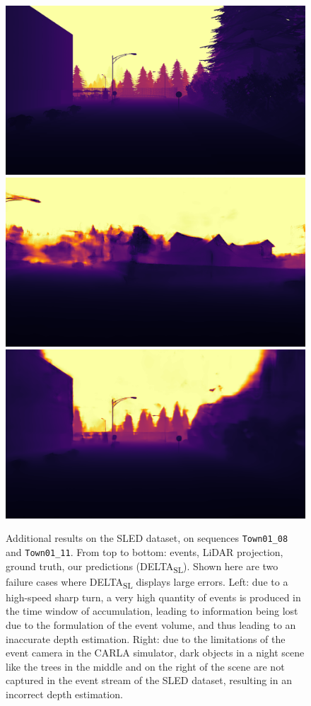 \begin{figure}
  \includegraphics[width=0.475\linewidth]{mainmatter/figures/c_depth_transf/sled_dense_cmp_additional/data_and_gt/gtprev002216.png}\\
  \includegraphics[width=0.475\linewidth]{mainmatter/figures/c_depth_transf/sled_dense_cmp_additional/delta/predbf001630.png}
  \includegraphics[width=0.475\linewidth]{mainmatter/figures/c_depth_transf/sled_dense_cmp_additional/delta/predbf002216.png}
  \cprotect\caption{Additional results on the SLED dataset, on sequences \verb|Town01_08| and \verb|Town01_11|. From top to bottom: events, LiDAR projection, ground truth, our predictions (DELTA\textsubscript{SL}). Shown here are two failure cases where DELTA\textsubscript{SL} displays large errors. Left: due to a high-speed sharp turn, a very high quantity of events is produced in the time window of accumulation, leading to information being lost due to the formulation of the event volume, and thus leading to an inaccurate depth estimation. Right: due to the limitations of the event camera in the CARLA simulator, dark objects in a night scene like the trees in the middle and on the right of the scene are not captured in the event stream of the SLED dataset, resulting in an incorrect depth estimation.}\label{fig:appendix:delta:cmp_sled_additional_bad_1}
\end{figure}


